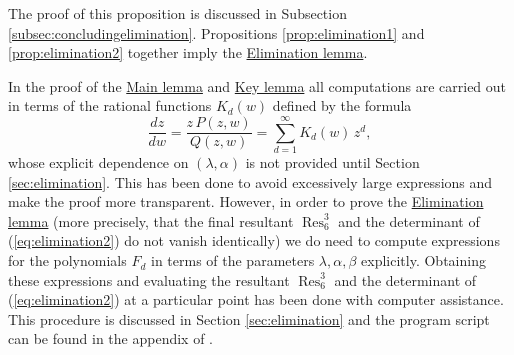 The proof of this proposition is discussed in Subsection \ref{subsec:concludingelimination}. Propositions \ref{prop:elimination1} and \ref{prop:elimination2} together imply the \hyperref[lemma:elimination]{Elimination lemma}.

\begin{remark}
In the proof of the \hyperref[lemma:main]{Main lemma} and \hyperref[lemma:key]{Key lemma} all computations are carried out in terms of the rational functions $K_d(w)$ defined by the formula
\[ \frac{dz}{dw}=\frac{z\,P(z,w)}{Q(z,w)}=\sum_{d=1}^{\infty}K_d(w)\,z^d, \]
whose explicit dependence on $(\lambda,\alpha)$ is not provided until Section \ref{sec:elimination}. This has been done to avoid excessively large expressions and make the proof more transparent. However, in order to prove the \hyperref[lemma:elimination]{Elimination lemma} (more precisely, that the final resultant $\operatorname{Res}^3_6$ and the determinant of (\ref{eq:elimination2}) do not vanish identically) we do need to compute expressions for the polynomials $F_d$ in terms of the parameters $\lambda,\alpha,\beta$ explicitly. Obtaining these expressions and evaluating the resultant $\operatorname{Res}^3_6$ and the determinant of (\ref{eq:elimination2}) at a particular point has been done with computer assistance. This procedure is discussed in Section \ref{sec:elimination} and the program script can be found in the appendix of \cite{arXivVersion}.
\end{remark}






















